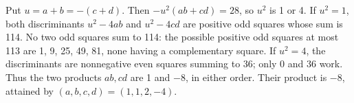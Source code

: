 Put $ u=a+b=-(c+d)$. Then $-u^2(ab+cd)=28 $, so $ u^2 $ is 1 or 4. If $ u^2=1 $, both discriminants $ u^2-4ab $ and $ u^2-4cd $ are positive odd squares whose sum is 114. No two odd squares sum to 114: the possible positive odd squares at most 113 are 1, 9, 25, 49, 81, none having a complementary square. If $ u^2=4 $, the discriminants are nonnegative even squares summing to 36; only 0 and 36 work. Thus the two products $ ab,cd $ are 1 and $-8 $, in either order. Their product is $\boxed{-8}$, attained by $(a,b,c,d)=(1,1,2,-4)$.
